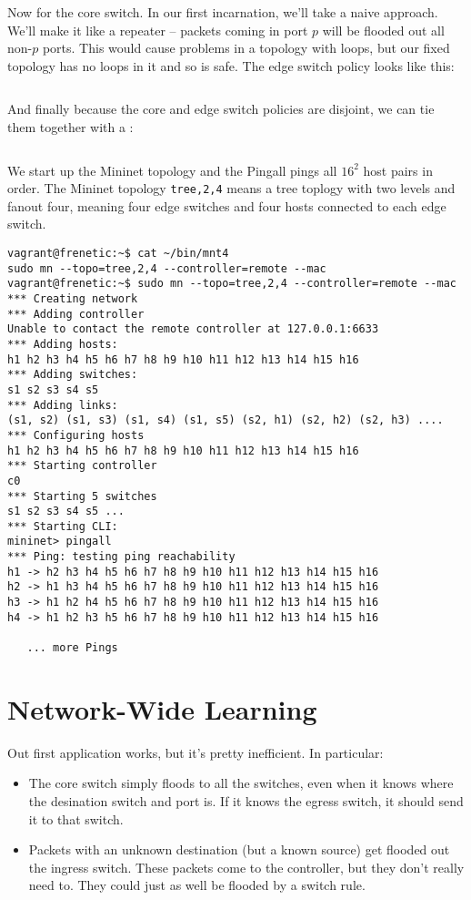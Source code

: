 Now for the core switch.  In our first incarnation, we'll take a naive approach.  We'll make it like
a repeater -- packets coming in port $p$ will be flooded out all non-$p$ ports.  This would cause problems
in a topology with loops, but our fixed topology has no loops in it and so is safe.  The edge
switch policy looks like this:

\inputminted[firstline=42,lastline=51]{python}{code/multiswitch_topologies/multiswitch1.py}

And finally because the core and edge switch policies are disjoint, we can tie them together with a 
:

\inputminted[firstline=53,lastline=54]{python}{code/multiswitch_topologies/multiswitch1.py}

We start up the Mininet topology and the Pingall pings all $16^2$ host pairs in order.  The Mininet 
topology \texttt{tree,2,4} means a tree toplogy with two levels and fanout four, meaning four
edge switches and four hosts connected to each edge switch.   

\begin{verbatim}
vagrant@frenetic:~$ cat ~/bin/mnt4
sudo mn --topo=tree,2,4 --controller=remote --mac
vagrant@frenetic:~$ sudo mn --topo=tree,2,4 --controller=remote --mac
*** Creating network
*** Adding controller
Unable to contact the remote controller at 127.0.0.1:6633
*** Adding hosts:
h1 h2 h3 h4 h5 h6 h7 h8 h9 h10 h11 h12 h13 h14 h15 h16
*** Adding switches:
s1 s2 s3 s4 s5
*** Adding links:
(s1, s2) (s1, s3) (s1, s4) (s1, s5) (s2, h1) (s2, h2) (s2, h3) ....
*** Configuring hosts
h1 h2 h3 h4 h5 h6 h7 h8 h9 h10 h11 h12 h13 h14 h15 h16
*** Starting controller
c0
*** Starting 5 switches
s1 s2 s3 s4 s5 ...
*** Starting CLI:
mininet> pingall
*** Ping: testing ping reachability
h1 -> h2 h3 h4 h5 h6 h7 h8 h9 h10 h11 h12 h13 h14 h15 h16
h2 -> h1 h3 h4 h5 h6 h7 h8 h9 h10 h11 h12 h13 h14 h15 h16
h3 -> h1 h2 h4 h5 h6 h7 h8 h9 h10 h11 h12 h13 h14 h15 h16
h4 -> h1 h2 h3 h5 h6 h7 h8 h9 h10 h11 h12 h13 h14 h15 h16

   ... more Pings
\end{verbatim}

\section{Network-Wide Learning}

Out first application works, but it's pretty inefficient.  In particular:

\begin{itemize}
\item The core switch simply floods to all the switches, even when it knows where the desination switch 
and port is.  If it knows the egress switch, it should send it to that switch.  
\item Packets with an unknown destination (but a known source) get flooded out the ingress switch.  
These packets come to the controller, but they don't really need to.  They could just as well be flooded 
by a switch rule.  
\end{itemize}

